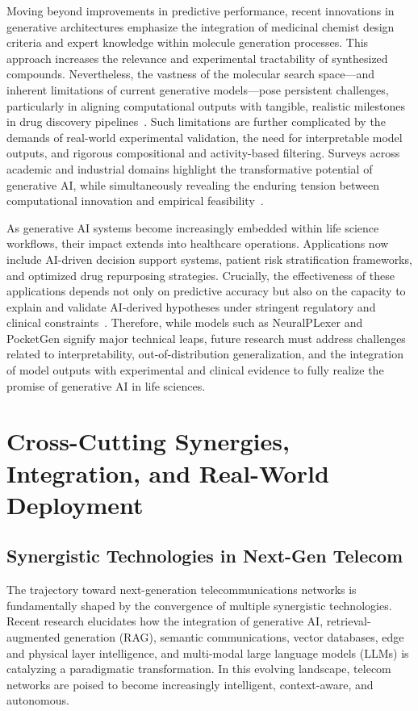 \documentclass[sigconf]{acmart}
\begin{document}
Moving beyond improvements in predictive performance, recent innovations in generative architectures emphasize the integration of medicinal chemist design criteria and expert knowledge within molecule generation processes. This approach increases the relevance and experimental tractability of synthesized compounds. Nevertheless, the vastness of the molecular search space---and inherent limitations of current generative models---pose persistent challenges, particularly in aligning computational outputs with tangible, realistic milestones in drug discovery pipelines~\cite{ref6}. Such limitations are further complicated by the demands of real-world experimental validation, the need for interpretable model outputs, and rigorous compositional and activity-based filtering. Surveys across academic and industrial domains highlight the transformative potential of generative AI, while simultaneously revealing the enduring tension between computational innovation and empirical feasibility~\cite{ref6,ref26}.

As generative AI systems become increasingly embedded within life science workflows, their impact extends into healthcare operations. Applications now include AI-driven decision support systems, patient risk stratification frameworks, and optimized drug repurposing strategies. Crucially, the effectiveness of these applications depends not only on predictive accuracy but also on the capacity to explain and validate AI-derived hypotheses under stringent regulatory and clinical constraints~\cite{ref26}. Therefore, while models such as NeuralPLexer and PocketGen signify major technical leaps, future research must address challenges related to interpretability, out-of-distribution generalization, and the integration of model outputs with experimental and clinical evidence to fully realize the promise of generative AI in life sciences.

\section{Cross-Cutting Synergies, Integration, and Real-World Deployment}

\subsection{Synergistic Technologies in Next-Gen Telecom}

The trajectory toward next-generation telecommunications networks is fundamentally shaped by the convergence of multiple synergistic technologies. Recent research elucidates how the integration of generative AI, retrieval-augmented generation (RAG), semantic communications, vector databases, edge and physical layer intelligence, and multi-modal large language models (LLMs) is catalyzing a paradigmatic transformation. In this evolving landscape, telecom networks are poised to become increasingly intelligent, context-aware, and autonomous.
\end{document}
